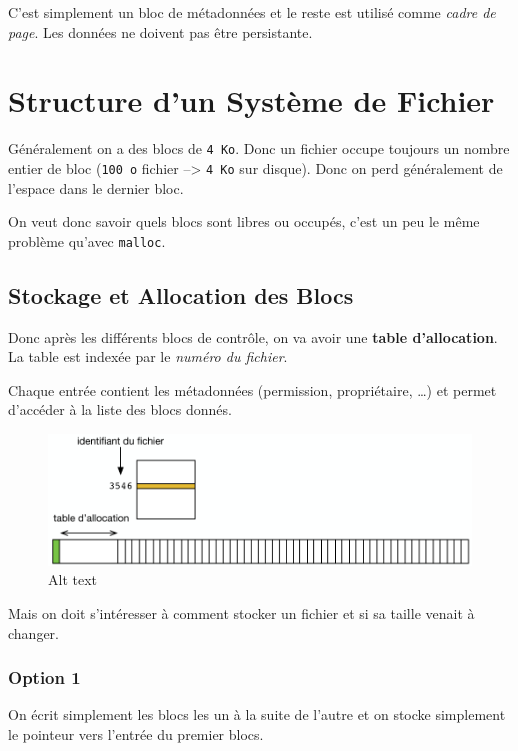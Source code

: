 C'est simplement un bloc de métadonnées et le reste est utilisé comme
\emph{cadre de page}. Les données ne doivent pas être persistante.

\section{Structure d'un Système de
Fichier}\label{structure-dun-systuxe8me-de-fichier}

Généralement on a des blocs de \texttt{4\ Ko}. Donc un fichier occupe
toujours un nombre entier de bloc (\texttt{100\ o} fichier
--\textgreater{} \texttt{4\ Ko} sur disque). Donc on perd généralement
de l'espace dans le dernier bloc.

On veut donc savoir quels blocs sont libres ou occupés, c'est un peu le
même problème qu'avec \texttt{malloc}.

\subsection{Stockage et Allocation des
Blocs}\label{stockage-et-allocation-des-blocs}

Donc après les différents blocs de contrôle, on va avoir une
\textbf{table d'allocation}. La table est indexée par le \emph{numéro du
fichier}.

Chaque entrée contient les métadonnées (permission, propriétaire,
\ldots) et permet d'accéder à la liste des blocs donnés.

\begin{figure}
\centering
\includegraphics{image-40.png}
\caption{Alt text}
\end{figure}

Mais on doit s'intéresser à comment stocker un fichier et si sa taille
venait à changer.

\subsubsection{Option 1}\label{option-1}

On écrit simplement les blocs les un à la suite de l'autre et on stocke
simplement le pointeur vers l'entrée du premier blocs.

